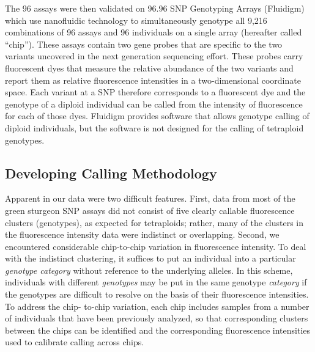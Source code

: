 The 96 assays were then validated on 96.96 SNP Genotyping Arrays (Fluidigm) 
which use nanofluidic technology to simultaneously genotype all 9,216 
combinations of 96 assays and 96 individuals on a single array (hereafter called “chip”). 
These assays contain two gene probes that are specific to the two variants 
uncovered in the next generation sequencing effort. These probes carry 
fluorescent dyes that measure the relative abundance of the two variants 
and report them as relative fluorescence intensities in a two-dimensional 
coordinate space. Each variant at a SNP therefore corresponds to a 
fluorescent dye and the genotype of a diploid individual can be called 
from the intensity of fluorescence for each of those dyes. 
Fluidigm provides software that allows genotype calling of diploid 
individuals, but the software is not designed for the calling of tetraploid genotypes. 


\subsection{Developing Calling Methodology}
Apparent in our data were two difficult features. First, data from most of the green sturgeon SNP
assays did not consist of five clearly callable
fluorescence clusters (genotypes), as expected for tetraploids; rather, many of
the clusters in the fluorescence intensity data were indistinct or overlapping.
Second, we encountered considerable chip-to-chip variation in fluorescence
intensity. To deal with the indistinct clustering, it suffices to put an
individual into a particular {\em genotype category} without reference to the
underlying alleles. In this scheme, individuals with different {\em genotypes} may be put in the
same genotype {\em category} if the genotypes are difficult to resolve on
the basis of their fluorescence intensities. To address the chip- to-chip
variation, each chip includes samples from a number of individuals that have
been previously analyzed, so that corresponding clusters between the chips can
be identified and the corresponding fluorescence intensities used to calibrate calling across chips.

